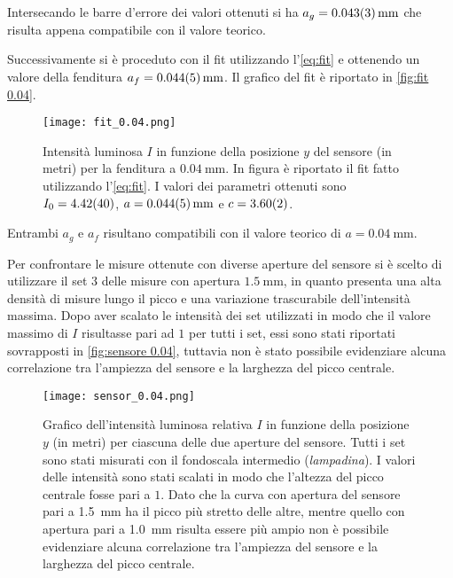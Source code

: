 \documentclass[../main.tex]{subfiles}
\begin{document}
Intersecando le barre d'errore dei valori ottenuti si ha $a_g = \qty{0.043+-0.003}{\mm}$ che risulta appena compatibile con il valore teorico.



\newpage

Successivamente si è proceduto con il fit utilizzando l'\autoref{eq:fit} e ottenendo un valore della fenditura $a_f = \qty{0.044+-0.005}{\mm}$. Il grafico del fit è riportato in \autoref{fig:fit 0.04}.

\begin{figure}[ht!]
    \centering
    \texttt{[image: fit\_0.04.png]}
    \caption{Intensità luminosa $I$ in funzione della posizione $y$ del sensore (in metri) per la fenditura a $\qty{0.04}{\mm}$. In figura è riportato il fit fatto utilizzando l'\autoref{eq:fit}. I valori dei parametri ottenuti sono $I_{0} = \num{4.42+-0.4}$, $a = \qty{0.044+-0.005}{\mm}$ e $c = \num{3.60+-0.02}$. }
    \label{fig:fit 0.04}
\end{figure}

Entrambi $a_g$ e $a_f$ risultano compatibili con il valore teorico di $a = \qty{0.04}{\mm}$.

Per confrontare le misure ottenute con diverse aperture del sensore si è scelto di utilizzare il set $3$ delle misure con apertura $\qty{1.5}{\mm}$, in quanto presenta una alta densità di misure lungo il picco e una variazione trascurabile dell'intensità massima. Dopo aver scalato le intensità dei set utilizzati in modo che il valore massimo di $I$ risultasse pari ad $1$ per tutti i set, essi sono stati riportati sovrapposti in \autoref{fig:sensore 0.04}, tuttavia non è stato possibile evidenziare alcuna correlazione tra l'ampiezza del sensore e la larghezza del picco centrale.

\begin{figure}[ht!]
    \centering
    \texttt{[image: sensor\_0.04.png]}
    \caption{Grafico dell'intensità luminosa relativa $I$ in funzione della posizione $y$ (in metri) per ciascuna delle due aperture del sensore.
    Tutti i set sono stati misurati con il fondoscala intermedio (\textit{lampadina}). I valori delle intensità sono stati scalati in modo che l'altezza del picco centrale fosse pari a $1$.
    Dato che la curva con apertura del sensore pari a \qty{1.5}{\mm} ha il picco più stretto delle altre, mentre quello con apertura pari a \qty{1.0}{\mm} risulta essere più ampio non è possibile evidenziare alcuna correlazione tra l'ampiezza del sensore e la larghezza del picco centrale.}
    \label{fig:sensore 0.04}
\end{figure}
\end{document}
